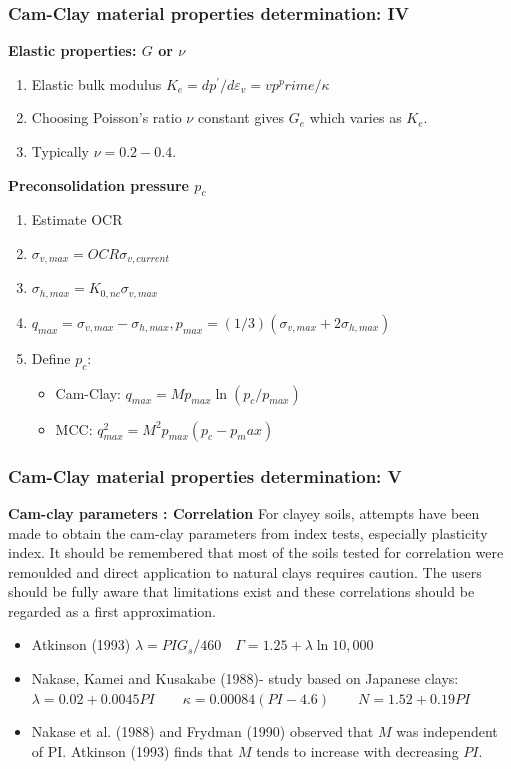 \documentclass[notes]{beamer}
\begin{document}
\begin{frame}
\frametitle{Cam-Clay material properties determination: IV}
\textbf{Elastic properties: $G$ or $\nu$}
\begin{enumerate}
	\item Elastic bulk modulus $K_e = dp^\prime / d\varepsilon_v = vp^prime / \kappa$
	\item Choosing Poisson's ratio $\nu$ constant gives $G_e$ which varies as $K_e$.
	\item Typically $\nu= 0.2 - 0.4$.
\end{enumerate}
\textbf{Preconsolidation pressure $p_c$}
\begin{enumerate}
	\item Estimate OCR
	\item $\sigma_{v, max} = OCR \sigma_{v, current}$
	\item $\sigma_{h, max} = K_{0, nc}\sigma_{v, max}$
	\item $q_{max} = \sigma_{v, max} - \sigma_{h, max}, p_{max} = (1/3) (\sigma_{v, max} + 2 \sigma_{h, max})$
	\item Define $p_c$:
	\begin{itemize}
		\item Cam-Clay: $q_{max} = M p_{max} \ln (p_c/ p_{max})$
		\item MCC: $q_{max}^2 = M^2 p_{max} (p_c - p_max)$
	\end{itemize}
\end{enumerate}
\end{frame}

\begin{frame}
\frametitle{Cam-Clay material properties determination: V}
\textbf{Cam-clay parameters : Correlation}
For clayey soils, attempts have been made to obtain the cam-clay parameters from
index tests, especially plasticity index. It should be remembered that most of the
soils tested for correlation were remoulded and direct application to natural clays
requires caution. The users should be fully aware that limitations exist and these
correlations should be regarded as a first approximation.
\begin{itemize}
	\item Atkinson (1993) $\lambda = PI G_s / 460 \quad \Gamma = 1.25 + \lambda \ln 10,000$
	\item Nakase, Kamei and Kusakabe (1988)- study based on Japanese clays: $\lambda = 0.02 + 0.0045 PI \qquad \kappa = 0.00084 (PI - 4.6) \qquad N = 1.52 + 0.19 PI$
	\item Nakase et al. (1988) and Frydman (1990) observed that $M$ was independent of PI.
	Atkinson (1993) finds that $M$ tends to increase with decreasing $PI$. 
	
\end{itemize}
\end{frame}
\end{document}
